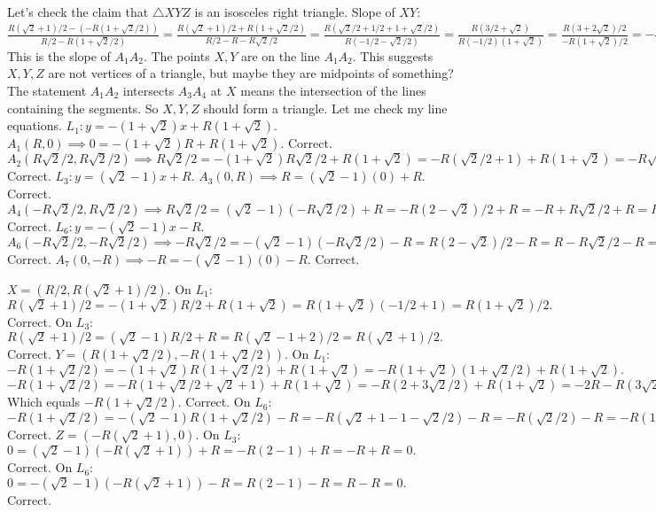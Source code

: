 Let's check the claim that $\triangle XYZ$ is an isosceles right triangle. 
Slope of $XY$: $\frac{R(\sqrt{2}+1)/2 - (-R(1+\sqrt{2}/2))}{R/2 - R(1+\sqrt{2}/2)} = \frac{R(\sqrt{2}+1)/2 + R(1+\sqrt{2}/2)}{R/2 - R - R\sqrt{2}/2} = \frac{R(\sqrt{2}/2+1/2+1+\sqrt{2}/2)}{R(-1/2-\sqrt{2}/2)} = \frac{R(3/2+\sqrt{2})}{R(-1/2)(1+\sqrt{2})} = \frac{R(3+2\sqrt{2})/2}{-R(1+\sqrt{2})/2} = -\frac{3+2\sqrt{2}}{1+\sqrt{2}} = -\frac{(1+\sqrt{2})^2}{1+\sqrt{2}} = -(1+\sqrt{2}).$ This is the slope of $A_1A_2.$ The points $X, Y$ are on the line $A_1A_2.$ This suggests $X, Y, Z$ are not vertices of a triangle, but maybe they are midpoints of something? The statement $A_1 A_2$ intersects $A_3 A_4$ at $X$ means the intersection of the lines containing the segments. So $X, Y, Z$ should form a triangle. Let me check my line equations. 
$L_1: y = -(1+\sqrt{2})x + R(1+\sqrt{2}).$ $A_1(R,0) \implies 0 = -(1+\sqrt{2})R + R(1+\sqrt{2}).$ Correct. $A_2(R\sqrt{2}/2, R\sqrt{2}/2) \implies R\sqrt{2}/2 = -(1+\sqrt{2})R\sqrt{2}/2 + R(1+\sqrt{2}) = -R(\sqrt{2}/2+1) + R(1+\sqrt{2}) = -R\sqrt{2}/2 - R + R + R\sqrt{2} = R\sqrt{2}/2.$ Correct. 
$L_3: y = (\sqrt{2}-1)x + R.$ $A_3(0, R) \implies R = (\sqrt{2}-1)(0) + R.$ Correct. $A_4(-R\sqrt{2}/2, R\sqrt{2}/2) \implies R\sqrt{2}/2 = (\sqrt{2}-1)(-R\sqrt{2}/2) + R = -R(2-\sqrt{2})/2 + R = -R + R\sqrt{2}/2 + R = R\sqrt{2}/2.$ Correct. 
$L_6: y = -(\sqrt{2}-1)x - R.$ $A_6(-R\sqrt{2}/2, -R\sqrt{2}/2) \implies -R\sqrt{2}/2 = -(\sqrt{2}-1)(-R\sqrt{2}/2) - R = R(2-\sqrt{2})/2 - R = R - R\sqrt{2}/2 - R = -R\sqrt{2}/2.$ Correct. $A_7(0, -R) \implies -R = -(\sqrt{2}-1)(0) - R.$ Correct.

$X = (R/2, R(\sqrt{2}+1)/2).$ On $L_1$: $R(\sqrt{2}+1)/2 = -(1+\sqrt{2})R/2 + R(1+\sqrt{2}) = R(1+\sqrt{2})(-1/2+1) = R(1+\sqrt{2})/2.$ Correct. On $L_3$: $R(\sqrt{2}+1)/2 = (\sqrt{2}-1)R/2 + R = R(\sqrt{2}-1+2)/2 = R(\sqrt{2}+1)/2.$ Correct. 
$Y = (R(1+\sqrt{2}/2), -R(1+\sqrt{2}/2)).$ On $L_1$: $-R(1+\sqrt{2}/2) = -(1+\sqrt{2})R(1+\sqrt{2}/2) + R(1+\sqrt{2}) = -R(1+\sqrt{2})(1+\sqrt{2}/2) + R(1+\sqrt{2}).$ $-R(1+\sqrt{2}/2) = -R(1+\sqrt{2}/2 + \sqrt{2} + 1) + R(1+\sqrt{2}) = -R(2 + 3\sqrt{2}/2) + R(1+\sqrt{2}) = -2R - R(3\sqrt{2}/2) + R + R\sqrt{2} = -R - R\sqrt{2}/2.$ Which equals $-R(1+\sqrt{2}/2).$ Correct. On $L_6$: $-R(1+\sqrt{2}/2) = -(\sqrt{2}-1)R(1+\sqrt{2}/2) - R = -R(\sqrt{2}+1-1-\sqrt{2}/2) - R = -R(\sqrt{2}/2) - R = -R(1+\sqrt{2}/2).$ Correct. 
$Z = (-R(\sqrt{2}+1), 0).$ On $L_3$: $0 = (\sqrt{2}-1)(-R(\sqrt{2}+1)) + R = -R(2-1) + R = -R+R = 0.$ Correct. On $L_6$: $0 = -(\sqrt{2}-1)(-R(\sqrt{2}+1)) - R = R(2-1) - R = R-R = 0.$ Correct.


